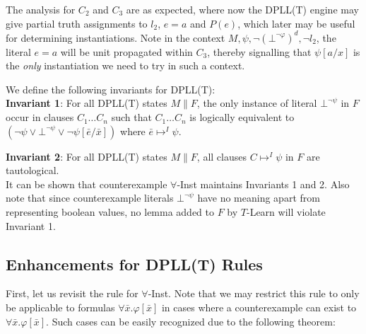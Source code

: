 \documentclass{llncs}
\begin{document}
The analysis for $C_2$ and $C_3$ are as expected, where now the DPLL(T) engine may give partial truth assignments to $l_2$, $e = a$ and $P( e )$, which later may be useful for determining instantiations.
Note in the context $M, \psi, \neg( \bot^{\neg \varphi} )^d, \neg l_2$, the literal $e = a$ will be unit propagated within $C_3$, thereby signalling that $\psi[a/x]$ is the \emph{only} instantiation we need to try in such a context.

We define the following invariants for DPLL(T): \\

{\bf Invariant 1}:
For all DPLL(T) states $M \parallel F$, the only instance of literal $\bot^{\neg \psi}$ in $F$ occur in clauses $C_1 \ldots C_n$ such that $C_1 \ldots C_n$ is logically equivalent to $( \neg \psi \vee \bot^{\neg \psi} \vee \neg \psi[\bar{e}/\bar{x}] )$ where $\bar{e} \mapsto^I \psi$.

{\bf Invariant 2}:
For all DPLL(T) states $M \parallel F$, all clauses $C \mapsto^I \psi$ in $F$ are tautological. \\

It can be shown that counterexample $\forall$-Inst maintains Invariants 1 and 2.
Also note that since counterexample literals $\bot^{ \neg \psi }$ have no meaning apart from representing boolean values, no lemma added to $F$ by $T$-Learn will violate Invariant 1.

\subsection{Enhancements for DPLL(T) Rules}

First, let us revisit the rule for $\forall$-Inst.
Note that we may restrict this rule to only be applicable to formulas $\forall \bar{x}. \varphi[ \bar{ x } ]$ in cases where a counterexample can exist to $\forall \bar{x}. \varphi[ \bar{ x } ]$.
Such cases can be easily recognized due to the following theorem:
\end{document}
